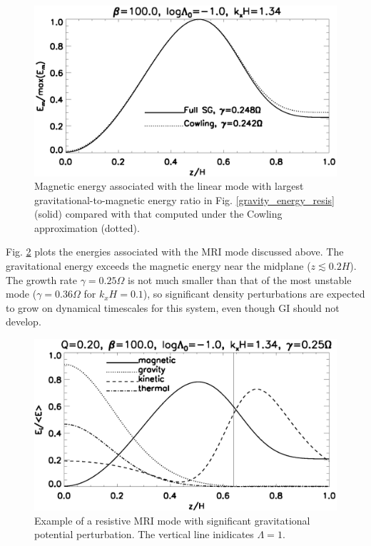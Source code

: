 \begin{figure}
  \includegraphics[width=\linewidth]{figures/compare_result_cowling}
  \caption{Magnetic energy associated with the linear mode with
    largest gravitational-to-magnetic energy ratio in
    Fig. \ref{gravity_energy_resis} (solid) compared with that computed
    under the Cowling approximation (dotted). %
    \label{mri_massive_cowling}}
\end{figure}

Fig. \ref{mri_massive_resis} plots the energies associated with the 
MRI mode discussed above. 
The gravitational energy exceeds the 
magnetic energy near the midplane ($z\lesssim0.2H$). The growth rate $\gamma=0.25\Omega$
is not much smaller than that of the most unstable mode
($\gamma=0.36\Omega$ for $k_xH=0.1$), so significant density
perturbations are expected to grow on dynamical timescales for this
system, even though GI should not develop. 

\begin{figure}
  \includegraphics[width=\linewidth]{figures/result_resis_sg}
  \caption{Example of a resistive MRI mode with significant
    gravitational potential perturbation.  The vertical line
    inidicates $\Lambda=1$.  
    \label{mri_massive_resis}}
\end{figure}

